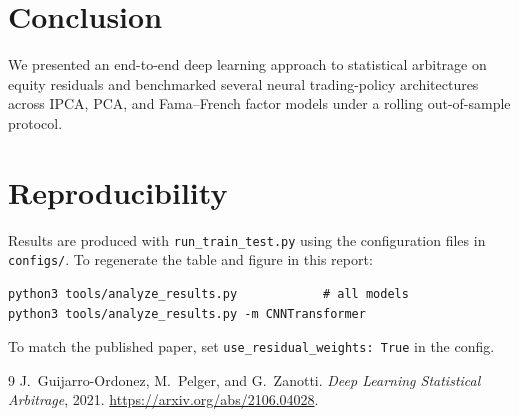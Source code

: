 \documentclass[11pt]{article}
\begin{document}
\section{Conclusion}
We presented an end-to-end deep learning approach to statistical arbitrage on
equity residuals and benchmarked several neural trading-policy architectures across
IPCA, PCA, and Fama--French factor models under a rolling out-of-sample protocol.

\section*{Reproducibility}
Results are produced with \texttt{run\_train\_test.py} using the configuration files
in \texttt{configs/}. To regenerate the table and figure in this report:
\begin{verbatim}
python3 tools/analyze_results.py            # all models
python3 tools/analyze_results.py -m CNNTransformer
\end{verbatim}
To match the published paper, set \texttt{use\_residual\_weights: True} in the config.

\begin{thebibliography}{9}
 J.~Guijarro-Ordonez, M.~Pelger, and G.~Zanotti.
  \emph{Deep Learning Statistical Arbitrage}, 2021.
  \url{https://arxiv.org/abs/2106.04028}.
\end{thebibliography}
\end{document}
